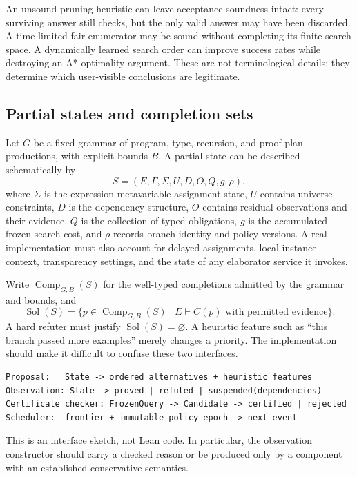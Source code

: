 \documentclass[11pt,a4paper]{article}
\newcommand{\code}[1]{\texttt{\detokenize{#1}}}
\newcommand{\Comp}{\operatorname{Comp}}
\theoremstyle{definition}
\theoremstyle{remark}
\begin{document}
An unsound pruning heuristic can leave acceptance soundness intact: every surviving answer still checks, but the only valid answer may have been discarded. A time-limited fair enumerator may be sound without completing its finite search space. A dynamically learned search order can improve success rates while destroying an A* optimality argument. These are not terminological details; they determine which user-visible conclusions are legitimate.

\subsection{Partial states and completion sets}

Let $G$ be a fixed grammar of program, type, recursion, and proof-plan productions, with explicit bounds $B$. A partial state can be described schematically by
\[
 S=(E,\Gamma,\Sigma,U,D,O,Q,g,\rho),
\]
where $\Sigma$ is the expression-metavariable assignment state, $U$ contains universe constraints, $D$ is the dependency structure, $O$ contains residual observations and their evidence, $Q$ is the collection of typed obligations, $g$ is the accumulated frozen search cost, and $\rho$ records branch identity and policy versions. A real implementation must also account for delayed assignments, local instance context, transparency settings, and the state of any elaborator service it invokes.

Write $\Comp_{G,B}(S)$ for the well-typed completions admitted by the grammar and bounds, and
\[
 \operatorname{Sol}(S)=
 \{p\in\Comp_{G,B}(S)\mid E\vdash C(p)\text{ with permitted evidence}\}.
\]
A hard refuter must justify $\operatorname{Sol}(S)=\varnothing$. A heuristic feature such as ``this branch passed more examples'' merely changes a priority. The implementation should make it difficult to confuse these two interfaces.

\par\noindent\begin{minipage}{\linewidth}
\begin{lstlisting}
Proposal:   State -> ordered alternatives + heuristic features
Observation: State -> proved | refuted | suspended(dependencies)
Certificate checker: FrozenQuery -> Candidate -> certified | rejected
Scheduler:  frontier + immutable policy epoch -> next event
\end{lstlisting}
\end{minipage}\par

This is an interface sketch, not Lean code. In particular, the observation constructor \code{refuted} should carry a checked reason or be produced only by a component with an established conservative semantics.
\end{document}

